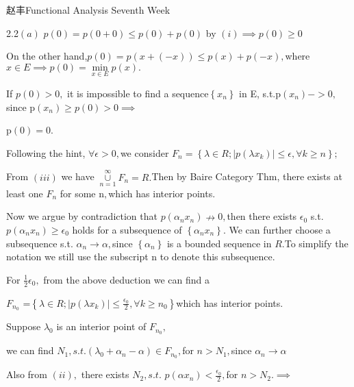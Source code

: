 \documentclass{article}
\begin{document}
\bigskip \bigskip 赵丰\qquad \qquad Functional
Analysis Seventh Week

2.2$\left( a\right) $ $p\left( 0\right) =p\left( 0+0\right) \leq p\left(
0\right) +p\left( 0\right) $ by $\left( i\right) \implies p\left( 0\right)
\geq 0$

On the other hand,$p\left( 0\right) =p\left( x+\left( -x\right) \right) \leq
p\left( x\right) +p\left( -x\right) ,$where $x\in E\implies p\left( 0\right)
=\underset{x\in E}{\min }p\left( x\right) .$

If $p\left( 0\right) >0,$ it is impossible to find a sequence$\left\{
x_{n}\right\} $ in E, s.t.p$\left( x_{n}\right) ->0,$since p$\left(
x_{n}\right) \geq p\left( 0\right) >0\implies $

p$\left( 0\right) =0.$

Following the hint, $\forall \epsilon >0,$we consider $F_{n}=\left\{ \lambda
\in R;\left\vert p\left( \lambda x_{k}\right) \right\vert \leq \epsilon
,\forall k\geq n\right\} ;$

From $\left( iii\right) $ we have $\underset{n=1}{\overset{\infty }{\cup }}%
F_{n}=R.$Then by Baire Category Thm, there exists at least one $F_{n}$ for
some n$,$which has interior points.

\bigskip Now we argue by contradiction that $p\left( \alpha _{n}x_{n}\right)
\nrightarrow 0,$then there exists $\epsilon _{0}$ s.t. $p\left( \alpha
_{n}x_{n}\right) \geq \epsilon _{0}$ holds for a subsequence of $\left\{
\alpha _{n}x_{n}\right\} .$ We can further choose a subsequence s.t. $\alpha
_{n}\rightarrow \alpha ,$since $\left\{ \alpha _{n}\right\} $ is a bounded
sequence in $R.$To simplify the notation we still use the subscript n to
denote this subsequence.

For $\frac{1}{2}\epsilon _{0},$ from the above deduction we can find a 

$F_{n_{0}}$ =$\left\{ \lambda \in R;\left\vert p\left( \lambda x_{k}\right)
\right\vert \leq \frac{\epsilon _{0}}{2},\forall k\geq n_{0}\right\} $which
has interior points.

Suppose $\lambda _{0}$ is an interior point of $F_{n_{0}},$ 

we can find $N_{1},s.t.\left( \lambda _{0}+\alpha _{n}-\alpha \right) \in
F_{n_{0}},$for $n>N_{1},$since  $\alpha _{n}\rightarrow \alpha $

Also from $\left( ii\right) ,$ there exists $N_{2},s.t.$ $p\left( \alpha
x_{n}\right) <\frac{\epsilon _{0}}{2},$for $n>N_{2}.\implies $
\end{document}

